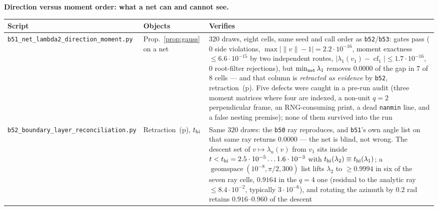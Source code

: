 \documentclass[11pt]{article}
\theoremstyle{remark}
\begin{document}
\noindent\textbf{Direction versus moment order: what a net can and cannot see.}
\begin{center}\footnotesize\begin{tabular}{@{}>{\raggedright\arraybackslash}p{5.1cm}%
>{\raggedright\arraybackslash}p{2.5cm}>{\raggedright\arraybackslash}p{5.8cm}@{}}
\toprule Script & Objects & Verifies\\
\midrule
\texttt{b51\_net\_lambda2\_\allowbreak direction\_moment.py} & Prop.~\ref{prop:gauss} on a net &
$320$ draws, eight cells, same seed and call order as \texttt{b52}/\texttt{b53}: gates pass ($0$ side
violations, $\max|\|v\|-1|=2.2\cdot10^{-16}$, moment exactness $\le6.6\cdot10^{-15}$ by two independent
routes, $|\lambda_1(v_1)-\operatorname{cf}_1|\le1.7\cdot10^{-16}$, $0$ root-filter rejections), but
$\min_{\rm net}\lambda_1$ removes $0.0000$ of the gap in $7$ of $8$ cells --- and that column is
\emph{retracted as evidence} by \texttt{b52}, retraction~(p). Five defects were caught in a pre-run
audit (three moment matrices where four are indexed, a non-unit $q=2$ perpendicular frame, an
RNG-consuming print, a dead \texttt{nanmin} line, and a false nesting premise); none of them survived
into the run\\
\texttt{b52\_boundary\_layer\_\allowbreak reconciliation.py} & Retraction~(p), $t_{\rm hi}$ &
Same $320$ draws: the \texttt{b50} ray reproduces, and \texttt{b51}'s own angle list on that same ray
returns $0.0000$ --- the net is blind, not wrong. The descent set of $v\mapsto\lambda_n(v)$ from $v_1$
sits inside $t<t_{\rm hi}=2.5\cdot10^{-5}\ldots1.6\cdot10^{-3}$ with $t_{\rm hi}(\lambda_2)\equiv
t_{\rm hi}(\lambda_1)$; a $\operatorname{geomspace}(10^{-8},\pi/2,300)$ list lifts $\lambda_2$ to
$\ge0.9994$ in six of the seven ray cells, $0.9164$ in the $q=4$ one (residual to the analytic ray
$\le8.4\cdot10^{-2}$, typically $3\cdot10^{-6}$),
and rotating the azimuth by $0.2$ rad retains $0.916$--$0.960$ of the descent\\
\bottomrule
\end{tabular}\end{center}
\end{document}
